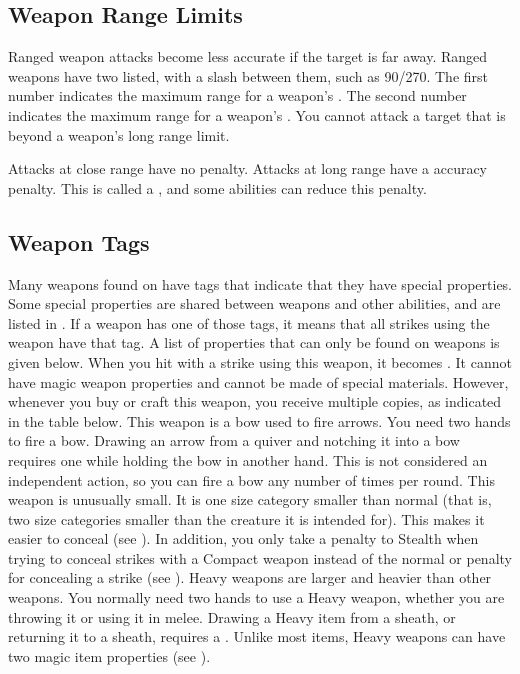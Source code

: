   \subsection{Weapon Range Limits}\label{Weapon Range Limits}
    Ranged weapon attacks become less accurate if the target is far away.
    Ranged weapons have two  listed, with a slash between them, such as 90/270.
    The first number indicates the maximum range for a weapon's .
    The second number indicates the maximum range for a weapon's .
    You cannot attack a target that is beyond a weapon's long range limit.

    Attacks at close range have no penalty.
    Attacks at long range have a  accuracy penalty.
    This is called a , and some abilities can reduce this penalty.

  \subsection{Weapon Tags}\label{Weapon Tags}
    Many weapons found on  have tags that indicate that they have special properties.
    Some special properties are shared between weapons and other abilities, and are listed in .
    If a weapon has one of those tags, it means that all strikes using the weapon have that tag.
    A list of properties that can only be found on weapons is given below.
     When you hit with a strike using this weapon, it becomes .
    It cannot have magic weapon properties and cannot be made of special materials.
    However, whenever you buy or craft this weapon, you receive multiple copies, as indicated in the table below.
     This weapon is a bow used to fire arrows.
    You need two hands to fire a bow.
    Drawing an arrow from a quiver and notching it into a bow requires one  while holding the bow in another hand.
    This is not considered an independent action, so you can fire a bow any number of times per round.
     This weapon is unusually small.
    It is one size category smaller than normal (that is, two size categories smaller than the creature it is intended for).
    This makes it easier to conceal (see ).
    In addition, you only take a  penalty to Stealth when trying to conceal strikes with a Compact weapon instead of the normal  or  penalty for concealing a strike (see ).
     Heavy weapons are larger and heavier than other weapons.
    You normally need two hands to use a Heavy weapon, whether you are throwing it or using it in melee.
    Drawing a Heavy item from a sheath, or returning it to a sheath, requires a .
    Unlike most items, Heavy weapons can have two magic item properties (see ).

